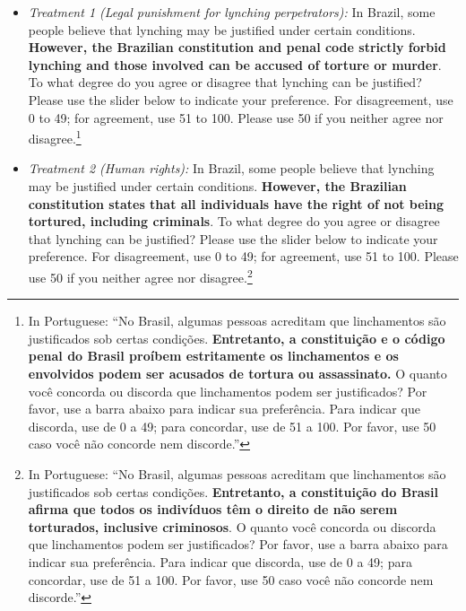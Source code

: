 \documentclass[12pt,ansiapaper]{article}
\providecommand{\tightlist}{%
   \setlength{\itemsep}{0pt}\setlength{\parskip}{0pt}}
\begin{document}
\begin{itemize}
\tightlist
\item
  \emph{Treatment 1 (Legal punishment for lynching perpetrators):} In Brazil, some people believe that lynching may be justified under certain conditions. \textbf{However, the Brazilian constitution and penal code strictly forbid lynching and those involved can be accused of torture or murder}. To what degree do you agree or disagree that lynching can be justified? Please use the slider below to indicate your preference. For disagreement, use 0 to 49; for agreement, use 51 to 100. Please use 50 if you neither agree nor disagree.\footnote{In Portuguese: ``No Brasil, algumas pessoas acreditam que linchamentos são justificados sob certas condições. \textbf{Entretanto, a constituição e o código penal do Brasil proíbem estritamente os linchamentos e os envolvidos podem ser acusados de tortura ou assassinato.} O quanto você concorda ou discorda que linchamentos podem ser justificados? Por favor, use a barra abaixo para indicar sua preferência. Para indicar que discorda, use de 0 a 49; para concordar, use de 51 a 100. Por favor, use 50 caso você não concorde nem discorde.''}
\end{itemize}

\begin{itemize}
\tightlist
\item
  \emph{Treatment 2 (Human rights):} In Brazil, some people believe that lynching may be justified under certain conditions. \textbf{However, the Brazilian constitution states that all individuals have the right of not being tortured, including criminals}. To what degree do you agree or disagree that lynching can be justified? Please use the slider below to indicate your preference. For disagreement, use 0 to 49; for agreement, use 51 to 100. Please use 50 if you neither agree nor disagree.\footnote{In Portuguese: ``No Brasil, algumas pessoas acreditam que linchamentos são justificados sob certas condições. \textbf{Entretanto, a constituição do Brasil afirma que todos os indivíduos têm o direito de não serem torturados, inclusive criminosos}. O quanto você concorda ou discorda que linchamentos podem ser justificados? Por favor, use a barra abaixo para indicar sua preferência. Para indicar que discorda, use de 0 a 49; para concordar, use de 51 a 100. Por favor, use 50 caso você não concorde nem discorde.''}
\end{itemize}
\end{document}
